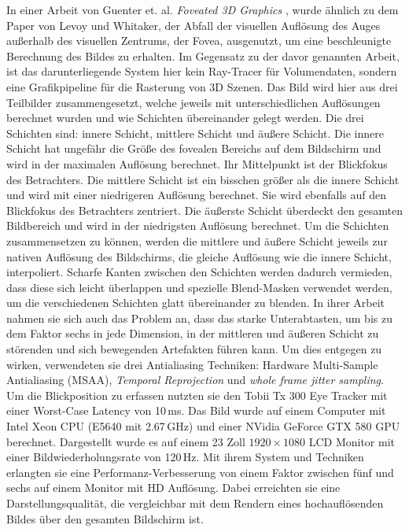 In einer Arbeit von Guenter et. al. \emph{Foveated 3D Graphics} \cite{foveated-3d-graphics}, wurde ähnlich zu dem Paper von Levoy und Whitaker, der Abfall der visuellen Auflösung des Auges außerhalb des visuellen Zentrums, der Fovea, ausgenutzt, um eine beschleunigte Berechnung des Bildes zu erhalten.
Im Gegensatz zu der davor genannten Arbeit, ist das darunterliegende System hier kein Ray-Tracer für Volumendaten, sondern eine Grafikpipeline für die Rasterung von 3D Szenen.
Das Bild wird hier aus drei Teilbilder zusammengesetzt, welche jeweils mit unterschiedlichen Auflösungen berechnet wurden und wie Schichten übereinander gelegt werden.
Die drei Schichten sind: innere Schicht, mittlere Schicht und äußere Schicht.
Die innere Schicht hat ungefähr die Größe des fovealen Bereichs auf dem Bildschirm und wird in der maximalen Auflösung berechnet.
Ihr Mittelpunkt ist der Blickfokus des Betrachters.
Die mittlere Schicht ist ein bisschen größer als die innere Schicht und wird mit einer niedrigeren Auflösung berechnet. 
Sie wird ebenfalls auf den Blickfokus des Betrachters zentriert.
Die äußerste Schicht überdeckt den gesamten Bildbereich und wird in der niedrigsten Auflösung berechnet.
Um die Schichten zusammensetzen zu können, werden die mittlere und äußere Schicht jeweils zur nativen Auflösung des Bildschirms, die gleiche Auflösung wie die innere Schicht, interpoliert.
Scharfe Kanten zwischen den Schichten werden dadurch vermieden, dass diese sich leicht überlappen und spezielle Blend-Masken verwendet werden, um die verschiedenen Schichten glatt übereinander zu blenden.
In ihrer Arbeit nahmen sie sich auch das Problem an, dass das starke Unterabtasten, um bis zu dem Faktor sechs in jede Dimension, in der mittleren und äußeren Schicht zu störenden und sich bewegenden Artefakten führen kann.
Um dies entgegen zu wirken, verwendeten sie drei Antialiasing Techniken: Hardware Multi-Sample Antialiasing (MSAA), \emph{Temporal Reprojection} und \emph{whole frame jitter sampling}.
Um die Blickposition zu erfassen nutzten sie den Tobii Tx 300 Eye Tracker mit einer Worst-Case Latency von 10\,ms.
Das Bild wurde auf einem Computer mit Intel Xeon CPU (E5640 mit 2.67\,GHz) und einer NVidia GeForce GTX 580 GPU berechnet.
Dargestellt wurde es auf einem 23 Zoll $1920\times1080$ LCD Monitor mit einer Bildwiederholungsrate von 120\,Hz.
Mit ihrem System und Techniken erlangten sie eine Performanz-Verbesserung von einem Faktor zwischen fünf und sechs auf einem Monitor mit HD Auflösung.
Dabei erreichten sie eine Darstellungsqualität, die vergleichbar mit dem Rendern eines hochauflösenden Bildes über den gesamten Bildschirm ist.

